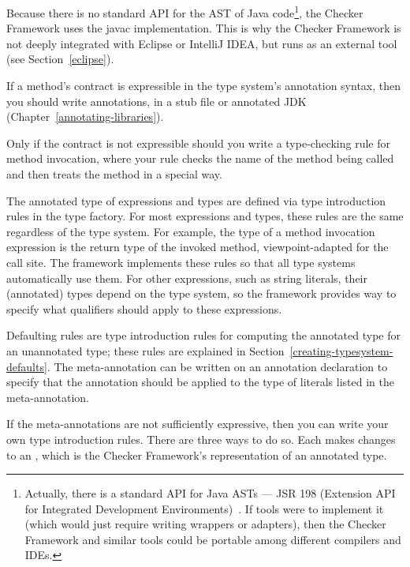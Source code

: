 Because there is no standard API for the AST of Java
code\footnote{Actually, there is a standard API for Java ASTs --- JSR 198
  (Extension API for Integrated Development Environments)~\cite{JSR198}.
  If tools were to implement it (which would just require writing wrappers
  or adapters), then the Checker Framework and similar tools could be
  portable among different compilers and IDEs.}, the Checker Framework uses
the javac implementation.  This is why the Checker Framework is not deeply
integrated with Eclipse or IntelliJ IDEA, but runs as an external tool (see
Section~\ref{eclipse}).



If a method's contract is expressible in the type system's annotation
syntax, then you should write annotations, in a stub file or annotated JDK
(Chapter~\ref{annotating-libraries}).

Only if the contract is not expressible should you write a type-checking
rule for method invocation, where your rule checks the name of the method
being called and then treats the method in a special way.



The annotated type of expressions and types are defined via type introduction rules in the
type factory.  For most expressions and types, these rules are the same regardless of the type system.
For example, the type of a method invocation expression is the return type of the invoked method,
viewpoint-adapted for the call site.  The framework implements these rules so that all type systems
automatically use them.  For other expressions, such as string literals, their (annotated) types depend
on the type system, so the framework provides way to specify what qualifiers should apply to these expressions.

Defaulting rules are type introduction rules for computing the annotated type for an unannotated type;
these rules are explained in Section~\ref{creating-typesystem-defaults}. The meta-annotation  can be written on an annotation
declaration to specify that the annotation should be applied to the type of literals listed in the
meta-annotation.


If the meta-annotations are not sufficiently expressive, then you
can write your own type introduction rules.  There are three ways to do so.
Each makes changes to an ,
which is the Checker Framework's representation of an annotated type.


